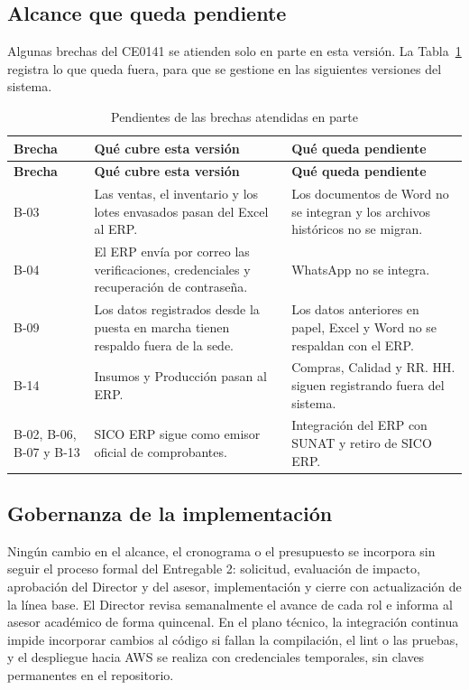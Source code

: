\subsection{Alcance que queda pendiente}


Algunas brechas del CE0141 se atienden solo en parte en esta versión. La Tabla~\ref{tab:cap4-6} registra lo que queda fuera, para que se gestione en las siguientes versiones del sistema.


{\small
\renewcommand{\arraystretch}{1.3}
\begin{longtable}{|>{\raggedright\arraybackslash}p{2.41cm}|>{\raggedright\arraybackslash}p{6.29cm}|>{\raggedright\arraybackslash}p{6.29cm}|}
\caption{Pendientes de las brechas atendidas en parte}\label{tab:cap4-6}\\
\hline
\textbf{Brecha} & \textbf{Qué cubre esta versión} & \textbf{Qué queda pendiente} \\
\hline
\endfirsthead
\hline
\textbf{Brecha} & \textbf{Qué cubre esta versión} & \textbf{Qué queda pendiente} \\
\hline
\endhead
B-03 & Las ventas, el inventario y los lotes envasados pasan del Excel al ERP. & Los documentos de Word no se integran y los archivos históricos no se migran. \\
\hline
B-04 & El ERP envía por correo las verificaciones, credenciales y recuperación de contraseña. & WhatsApp no se integra. \\
\hline
B-09 & Los datos registrados desde la puesta en marcha tienen respaldo fuera de la sede. & Los datos anteriores en papel, Excel y Word no se respaldan con el ERP. \\
\hline
B-14 & Insumos y Producción pasan al ERP. & Compras, Calidad y RR. HH. siguen registrando fuera del sistema. \\
\hline
B-02, B-06, B-07 y B-13 & SICO ERP sigue como emisor oficial de comprobantes. & Integración del ERP con SUNAT y retiro de SICO ERP. \\
\hline
\end{longtable}
}


\subsection{Gobernanza de la implementación}


Ningún cambio en el alcance, el cronograma o el presupuesto se incorpora sin seguir el proceso formal del Entregable 2: solicitud, evaluación de impacto, aprobación del Director y del asesor, implementación y cierre con actualización de la línea base. El Director revisa semanalmente el avance de cada rol e informa al asesor académico de forma quincenal. En el plano técnico, la integración continua impide incorporar cambios al código si fallan la compilación, el lint o las pruebas, y el despliegue hacia AWS se realiza con credenciales temporales, sin claves permanentes en el repositorio.

